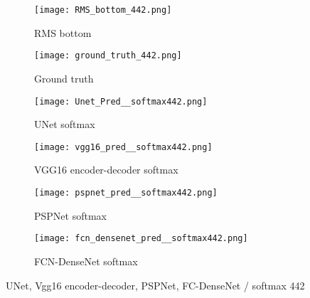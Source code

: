 \begin{figure}[!h]
	\centering
	\begin{subfigure}[b]{0.47\textwidth}
		\centering
		\texttt{[image: RMS\_bottom\_442.png]}
		\caption{RMS bottom}
		\label{fig:RMS_flat_shell_Vz_442}
	\end{subfigure}
	\hfill
	\begin{subfigure}[b]{0.47\textwidth}
		\centering
		\texttt{[image: ground\_truth\_442.png]}
		\caption{Ground truth}
		\label{fig:m1_rand_single_delam_442}
	\end{subfigure}
	\begin{subfigure}[b]{0.47\textwidth}
		\centering
		\texttt{[image: Unet\_Pred\_\_softmax442.png]}
		\caption{UNet softmax}
		\label{fig:Unet_Pred__softmax442}
	\end{subfigure}
	\hfill
	\begin{subfigure}[b]{0.47\textwidth}
		\centering
		\texttt{[image: vgg16\_pred\_\_softmax442.png]}
		\caption{VGG16 encoder-decoder softmax}			\label{fig:vgg16_pred__softmax442}			
	\end{subfigure}
	\hfill
	\begin{subfigure}[b]{0.47\textwidth}
		\centering
		\texttt{[image: pspnet\_pred\_\_softmax442.png]}
		\caption{PSPNet softmax}
		\label{fig:pspnet_pred__softmax442}
	\end{subfigure}	
	\hfill
	\begin{subfigure}[b]{0.47\textwidth}
		\centering
		\texttt{[image: fcn\_densenet\_pred\_\_softmax442.png]}
		\caption{FCN-DenseNet softmax}
		\label{fig:fcn_densenet_pred__softmax442}
	\end{subfigure}	
	\caption{UNet, Vgg16 encoder-decoder, PSPNet, FC-DenseNet / softmax 442}
	\label{fig:442_softmax}
\end{figure}
